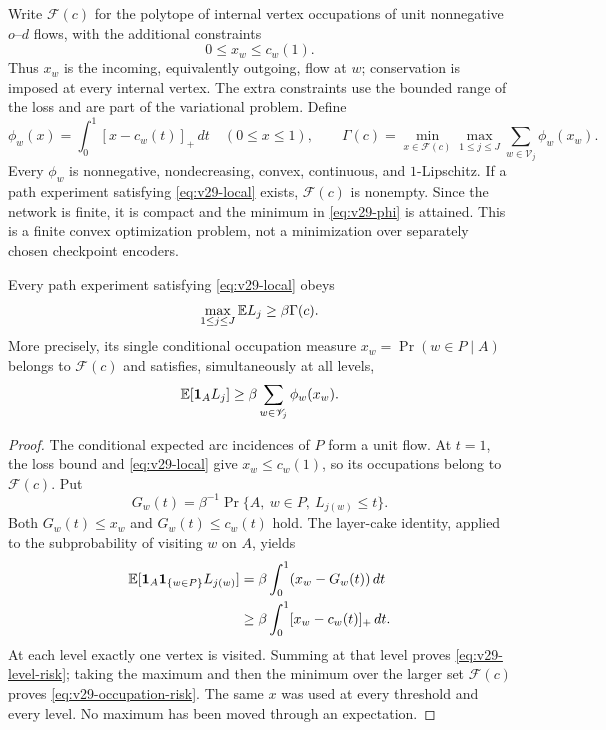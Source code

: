 Write $\mathcal F(c)$ for the polytope of internal vertex occupations
of unit nonnegative $o$--$d$ flows, with the additional constraints
\begin{equation}\label{eq:v29-terminal-cap}
                         0\le x_w\le c_w(1).
\end{equation}
Thus $x_w$ is the incoming, equivalently outgoing, flow at $w$;
conservation is imposed at every internal vertex. The extra constraints
use the bounded range of the loss and are part of the variational
problem. Define
\begin{equation}\label{eq:v29-phi}
 \phi_w(x)=\int_0^1[x-c_w(t)]_+\,dt\quad(0\le x\le1),\qquad
 \Gamma(c)=\min_{x\in\mathcal F(c)}
             \max_{1\le j\le J}\sum_{w\in\mathscr V_j}\phi_w(x_w).
\end{equation}
Every $\phi_w$ is nonnegative, nondecreasing, convex, continuous, and
$1$-Lipschitz. If a path experiment satisfying
\eqref{eq:v29-local} exists, $\mathcal F(c)$ is nonempty. Since the
network is finite, it is compact and the minimum in
\eqref{eq:v29-phi} is attained. This is a finite convex optimization
problem, not a minimization over separately chosen checkpoint encoders.

\begin{theorem}\label{thm:v29-occupation}
Every path experiment satisfying \eqref{eq:v29-local} obeys
\begin{equation}\label{eq:v29-occupation-risk}
             \max_{1\le j\le J}\mathbb E L_j\ge\beta\Gamma(c).
\end{equation}
More precisely, its single conditional occupation measure
$x_w=\Pr(w\in P\mid A)$ belongs to $\mathcal F(c)$ and satisfies,
simultaneously at all levels,
\begin{equation}\label{eq:v29-level-risk}
 \mathbb E[\mathbf1_A L_j]\ge
                  \beta\sum_{w\in\mathscr V_j}\phi_w(x_w).
\end{equation}
\end{theorem}
\begin{proof}
The conditional expected arc incidences of $P$ form a unit flow.
At $t=1$, the loss bound and \eqref{eq:v29-local} give
$x_w\le c_w(1)$, so its occupations belong to $\mathcal F(c)$.
Put
\[
 G_w(t)=\beta^{-1}\Pr\{A,\ w\in P,\ L_{j(w)}\le t\}.
\]
Both $G_w(t)\le x_w$ and $G_w(t)\le c_w(t)$ hold. The layer-cake
identity, applied to the subprobability of visiting $w$ on $A$, yields
\[
 \begin{split}
 \mathbb E[\mathbf1_A\mathbf1_{\{w\in P\}}L_{j(w)}]
   &=\beta\int_0^1(x_w-G_w(t))\,dt\\
   &\ge\beta\int_0^1[x_w-c_w(t)]_+\,dt.
 \end{split}
\]
At each level exactly one vertex is visited. Summing at that level
proves \eqref{eq:v29-level-risk}; taking the maximum and then the
minimum over the larger set $\mathcal F(c)$ proves
\eqref{eq:v29-occupation-risk}. The same $x$ was used at every
threshold and every level. No maximum has been moved through an
expectation.
\end{proof}

